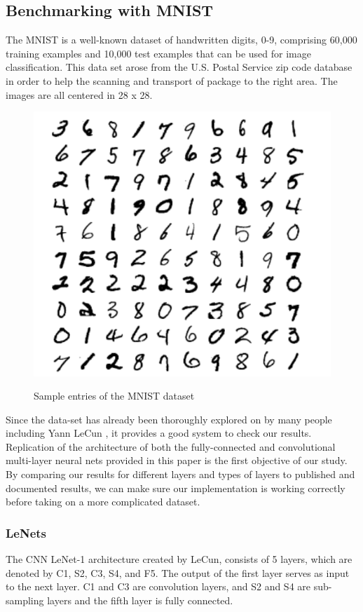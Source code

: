 \documentclass[12pt, twocolumn]{article}
\begin{document}
\subsection{Benchmarking with MNIST}


The MNIST is a well-known dataset of handwritten digits, 0-9, comprising 60,000 training examples and 10,000 test examples \cite{MNIST}  that can be used for image classification.  This data set arose from the U.S. Postal Service zip code database in order to help the scanning and transport of package to the right area. The images are all centered in 28 x 28.

\begin{figure}
\includegraphics[scale=.8]{MNISTnos.png}
\label{fig:MNISTex}
\caption{Sample entries of the MNIST dataset \cite{LeCun1998}}
\end{figure}

Since the data-set has already been thoroughly explored on by many people including Yann LeCun \cite{LeCun1998}, it provides a good system to check our results.  Replication of the architecture of both the fully-connected and convolutional multi-layer neural nets provided in this paper is the first objective of our study. By comparing our results for different layers and types of layers to published and documented results, we can make sure our implementation is working correctly before taking on a more complicated dataset. 

\subsubsection{LeNets}
The CNN LeNet-1 architecture created by LeCun, consists of 5 layers, which are denoted by C1, S2, C3, S4, and F5.  The output of the first layer serves as
input to the next layer. C1 and C3 are convolution layers, and S2 and S4 are sub-sampling layers and the fifth layer is fully connected. \cite{LeCun89}
\end{document}
